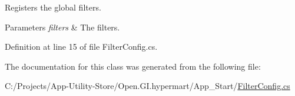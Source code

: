 Registers the global filters. 


\begin{DoxyParams}{Parameters}
{\em filters} & The filters.\\
\hline
\end{DoxyParams}


Definition at line 15 of file Filter\+Config.\+cs.



The documentation for this class was generated from the following file\+:\begin{DoxyCompactItemize}
\item 
C\+:/\+Projects/\+App-\/\+Utility-\/\+Store/\+Open.\+G\+I.\+hypermart/\+App\+\_\+\+Start/\hyperlink{_filter_config_8cs}{Filter\+Config.\+cs}\end{DoxyCompactItemize}
